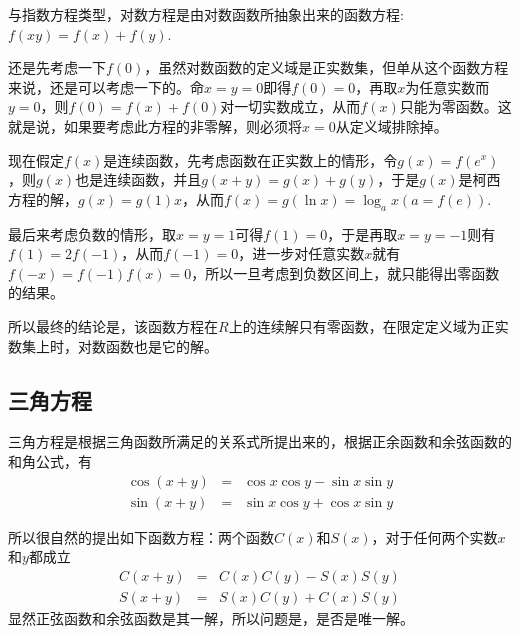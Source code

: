 与指数方程类型，对数方程是由对数函数所抽象出来的函数方程: $f(xy)=f(x)+f(y)$.

还是先考虑一下$f(0)$，虽然对数函数的定义域是正实数集，但单从这个函数方程来说，还是可以考虑一下的。命$x=y=0$即得$f(0)=0$，再取$x$为任意实数而$y=0$，则$f(0)=f(x)+f(0)$对一切实数成立，从而$f(x)$只能为零函数。这就是说，如果要考虑此方程的非零解，则必须将$x=0$从定义域排除掉。

现在假定$f(x)$是连续函数，先考虑函数在正实数上的情形，令$g(x)=f(e^x)$，则$g(x)$也是连续函数，并且$g(x+y)=g(x)+g(y)$，于是$g(x)$是柯西方程的解，$g(x)=g(1)x$，从而$f(x)=g(\ln{x})=\log_a{x}(a=f(e))$.

最后来考虑负数的情形，取$x=y=1$可得$f(1)=0$，于是再取$x=y=-1$则有$f(1)=2f(-1)$，从而$f(-1)=0$，进一步对任意实数$x$就有$f(-x)=f(-1)f(x)=0$，所以一旦考虑到负数区间上，就只能得出零函数的结果。

所以最终的结论是，该函数方程在$R$上的连续解只有零函数，在限定定义域为正实数集上时，对数函数也是它的解。

\subsection{三角方程}
\label{sec:triangle-function-equation}

三角方程是根据三角函数所满足的关系式所提出来的，根据正余函数和余弦函数的和角公式，有
\begin{eqnarray*}
  \cos{(x+y)} & = & \cos{x}\cos{y} - \sin{x}\sin{y} \\
  \sin{(x+y)} & = & \sin{x}\cos{y} + \cos{x}\sin{y}
\end{eqnarray*}

所以很自然的提出如下函数方程：两个函数$C(x)$和$S(x)$，对于任何两个实数$x$和$y$都成立
\begin{eqnarray*}
  C{(x+y)} & = & C(x)C(y) - S(x)S(y) \\
  S{(x+y)} & = & S(x)C(y) + C(x)S(y)
\end{eqnarray*}
显然正弦函数和余弦函数是其一解，所以问题是，是否是唯一解。




